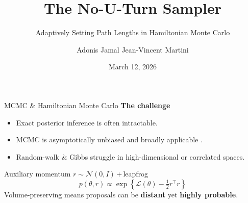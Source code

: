 \documentclass{beamer}
\title{The No-U-Turn Sampler}
\subtitle{Adaptively Setting Path Lengths in Hamiltonian Monte Carlo}
\author{Adonis Jamal \quad Jean-Vincent Martini}
\institute{\'Ecole Normale Sup\'erieure Paris-Saclay --- MVA 2025--2026}
\date{March 12, 2026}
\begin{document}
\maketitle

\begin{frame}{MCMC \& Hamiltonian Monte Carlo}
    \textbf{The challenge}
    \begin{itemize}
        \item Exact posterior inference is often intractable.
        \item MCMC is asymptotically unbiased and broadly applicable \cite{neal1993probabilistic}.
        \item Random-walk \& Gibbs \cite{metropolis1953equation,geman1984stochastic} struggle in high-dimensional or correlated spaces.
    \end{itemize}

    \begin{tcolorbox}[keybox, title=Hamiltonian Monte Carlo]
        Auxiliary momentum $r \!\sim\! \mathcal{N}(0,I)$\,+\,leapfrog
        \[p(\theta,r)\!\propto\!\exp\!\left\{\mathcal{L}(\theta)-\tfrac{1}{2}r^\top r\right\}\]
        Volume-preserving means proposals can be \textbf{distant} yet \textbf{highly probable}.
    \end{tcolorbox}
\end{frame}
\end{document}
